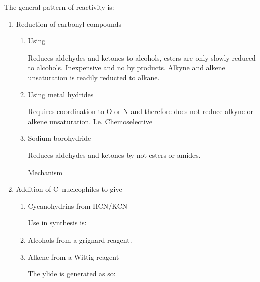The general pattern of reactivity is:


\begin{enumerate}[label=\alph*)]

	\item Reduction of carbonyl compounds

		\begin{enumerate}[label=\roman*)]

			\item Using 

				Reduces aldehydes and ketones to alcohols, esters are only slowly
				reduced to alcohols. Inexpensive and no by products. Alkyne and alkene
				unsaturation is readily reducted to alkane.


			\item Using metal hydrides

				Requires coordination to O or N and therefore does not reduce alkyne
				or alkene unsaturation. I.e. Chemoselective


			\item Sodium borohydride

				Reduces aldehydes and ketones by not esters or amides.


				Mechanism


		\end{enumerate}

	\item Addition of C--nucleophiles to give

		\begin{enumerate}[label=\roman*)]

			\item Cycanohydrins from HCN/KCN


				Use in synthesis is:


			\item Alcohols from a grignard reagent.

			\item Alkene from a Wittig reagent


				The ylide is generated as so:


\end{enumerate}
\end{enumerate}
